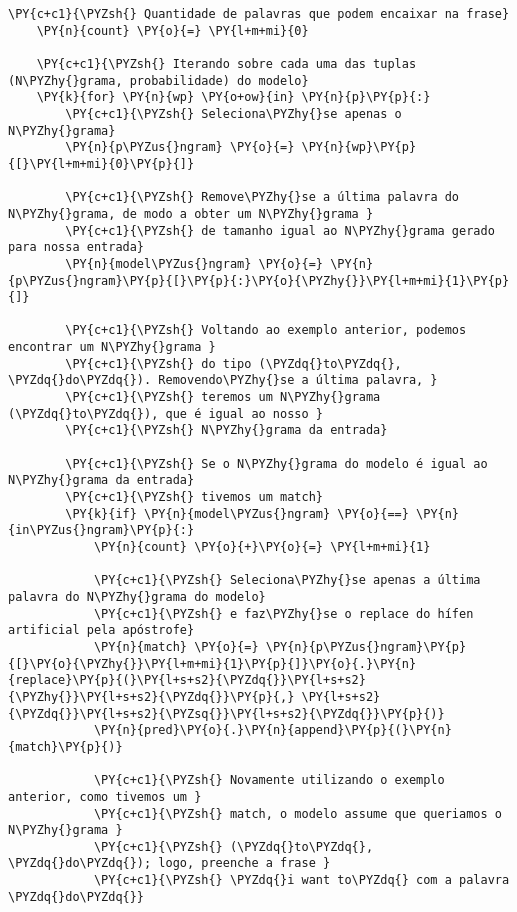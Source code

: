 \documentclass[a4paper,11pt,final]{article}
\begin{document}
\begin{Verbatim}[commandchars=\\\{\},frame=single,fontsize=\small, xleftmargin=0.5em]
    \PY{c+c1}{\PYZsh{} Quantidade de palavras que podem encaixar na frase}
    \PY{n}{count} \PY{o}{=} \PY{l+m+mi}{0}
    
    \PY{c+c1}{\PYZsh{} Iterando sobre cada uma das tuplas (N\PYZhy{}grama, probabilidade) do modelo}
    \PY{k}{for} \PY{n}{wp} \PY{o+ow}{in} \PY{n}{p}\PY{p}{:}
        \PY{c+c1}{\PYZsh{} Seleciona\PYZhy{}se apenas o N\PYZhy{}grama}
        \PY{n}{p\PYZus{}ngram} \PY{o}{=} \PY{n}{wp}\PY{p}{[}\PY{l+m+mi}{0}\PY{p}{]}

        \PY{c+c1}{\PYZsh{} Remove\PYZhy{}se a última palavra do N\PYZhy{}grama, de modo a obter um N\PYZhy{}grama }
        \PY{c+c1}{\PYZsh{} de tamanho igual ao N\PYZhy{}grama gerado para nossa entrada}
        \PY{n}{model\PYZus{}ngram} \PY{o}{=} \PY{n}{p\PYZus{}ngram}\PY{p}{[}\PY{p}{:}\PY{o}{\PYZhy{}}\PY{l+m+mi}{1}\PY{p}{]}

        \PY{c+c1}{\PYZsh{} Voltando ao exemplo anterior, podemos encontrar um N\PYZhy{}grama }
        \PY{c+c1}{\PYZsh{} do tipo (\PYZdq{}to\PYZdq{}, \PYZdq{}do\PYZdq{}). Removendo\PYZhy{}se a última palavra, }
        \PY{c+c1}{\PYZsh{} teremos um N\PYZhy{}grama (\PYZdq{}to\PYZdq{}), que é igual ao nosso }
        \PY{c+c1}{\PYZsh{} N\PYZhy{}grama da entrada}

        \PY{c+c1}{\PYZsh{} Se o N\PYZhy{}grama do modelo é igual ao N\PYZhy{}grama da entrada}
        \PY{c+c1}{\PYZsh{} tivemos um match}
        \PY{k}{if} \PY{n}{model\PYZus{}ngram} \PY{o}{==} \PY{n}{in\PYZus{}ngram}\PY{p}{:}
            \PY{n}{count} \PY{o}{+}\PY{o}{=} \PY{l+m+mi}{1}
            
            \PY{c+c1}{\PYZsh{} Seleciona\PYZhy{}se apenas a última palavra do N\PYZhy{}grama do modelo}
            \PY{c+c1}{\PYZsh{} e faz\PYZhy{}se o replace do hífen artificial pela apóstrofe}
            \PY{n}{match} \PY{o}{=} \PY{n}{p\PYZus{}ngram}\PY{p}{[}\PY{o}{\PYZhy{}}\PY{l+m+mi}{1}\PY{p}{]}\PY{o}{.}\PY{n}{replace}\PY{p}{(}\PY{l+s+s2}{\PYZdq{}}\PY{l+s+s2}{\PYZhy{}}\PY{l+s+s2}{\PYZdq{}}\PY{p}{,} \PY{l+s+s2}{\PYZdq{}}\PY{l+s+s2}{\PYZsq{}}\PY{l+s+s2}{\PYZdq{}}\PY{p}{)}
            \PY{n}{pred}\PY{o}{.}\PY{n}{append}\PY{p}{(}\PY{n}{match}\PY{p}{)}
            
            \PY{c+c1}{\PYZsh{} Novamente utilizando o exemplo anterior, como tivemos um }
            \PY{c+c1}{\PYZsh{} match, o modelo assume que queriamos o N\PYZhy{}grama }
            \PY{c+c1}{\PYZsh{} (\PYZdq{}to\PYZdq{}, \PYZdq{}do\PYZdq{}); logo, preenche a frase }
            \PY{c+c1}{\PYZsh{} \PYZdq{}i want to\PYZdq{} com a palavra \PYZdq{}do\PYZdq{}}


\end{Verbatim}
\end{document}
